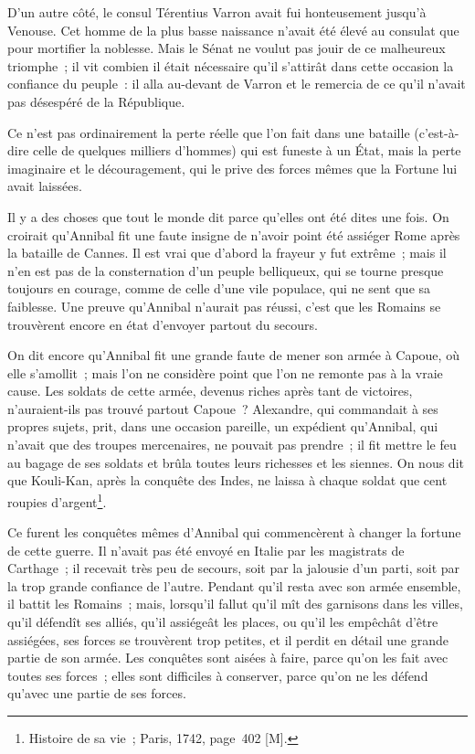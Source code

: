 \documentclass[french,twoside]{book} %
\newcommand\chapterclose{} %
\begin{document}
D’un autre côté, le consul Térentius Varron avait fui honteusement jusqu’à Venouse. Cet homme de la plus basse naissance n’avait été élevé au consulat que pour mortifier la noblesse. Mais le Sénat ne voulut pas jouir de ce malheureux triomphe ; il vit combien il était nécessaire qu’il s’attirât dans cette occasion la confiance du peuple : il alla au-devant de Varron et le remercia de ce qu’il n’avait pas désespéré de la République.\par
Ce n’est pas ordinairement la perte réelle que l’on fait dans une bataille (c’est-à-dire celle de quelques milliers d’hommes) qui est funeste à un État, mais la perte imaginaire et le découragement, qui le prive des forces mêmes que la Fortune lui avait laissées.\par
Il y a des choses que tout le monde dit parce qu’elles ont été dites une fois. On croirait qu’Annibal fit une faute insigne de n’avoir point été assiéger Rome après la bataille de Cannes. Il est vrai que d’abord la frayeur y fut extrême ; mais il n’en est pas de la consternation d’un peuple belliqueux, qui se tourne presque toujours en courage, comme de celle d’une vile populace, qui ne sent que sa faiblesse. Une preuve qu’Annibal n’aurait pas réussi, c’est que les Romains se trouvèrent encore en état d’envoyer partout du secours.\par
On dit encore qu’Annibal fit une grande faute de mener son armée à Capoue, où elle s’amollit ; mais l’on ne considère point que l’on ne remonte pas à la vraie cause. Les soldats de cette armée, devenus riches après tant de victoires, n’auraient-ils pas trouvé partout Capoue ? Alexandre, qui commandait à ses propres sujets, prit, dans une occasion pareille, un expédient qu’Annibal, qui n’avait que des troupes mercenaires, ne pouvait pas prendre ; il fit mettre le feu au bagage de ses soldats et brûla toutes leurs richesses et les siennes. On nous dit que Kouli-Kan, après la conquête des Indes, ne laissa à chaque soldat que cent roupies d’argent\footnote{Histoire de sa vie ; Paris, 1742, page 402 [M].}.\par
Ce furent les conquêtes mêmes d’Annibal qui commencèrent à changer la fortune de cette guerre. Il n’avait pas été envoyé en Italie par les magistrats de Carthage ; il recevait très peu de secours, soit par la jalousie d’un parti, soit par la trop grande confiance de l’autre. Pendant qu’il resta avec son armée ensemble, il battit les Romains ; mais, lorsqu’il fallut qu’il mît des garnisons dans les villes, qu’il défendît ses alliés, qu’il assiégeât les places, ou qu’il les empêchât d’être assiégées, ses forces se trouvèrent trop petites, et il perdit en détail une grande partie de son armée. Les conquêtes sont aisées à faire, parce qu’on les fait avec toutes ses forces ; elles sont difficiles à conserver, parce qu’on ne les défend qu’avec une partie de ses forces.
\chapterclose
\end{document}
